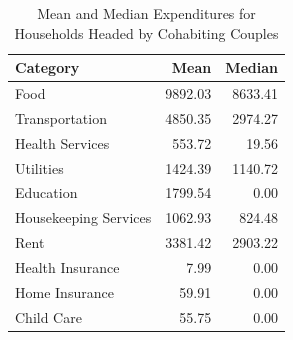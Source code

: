 \begin{table}[htbp]
\centering
\caption{Mean and Median Expenditures for Households Headed by Cohabiting Couples} 
\label{tab:cohabiting_expenditures}
\begin{tabular}{lrr}
  \hline
Category & Mean & Median \\ 
  \hline
Food & 9892.03 & 8633.41 \\ 
  Transportation & 4850.35 & 2974.27 \\ 
  Health Services & 553.72 & 19.56 \\ 
  Utilities & 1424.39 & 1140.72 \\ 
  Education & 1799.54 & 0.00 \\ 
  Housekeeping Services & 1062.93 & 824.48 \\ 
  Rent & 3381.42 & 2903.22 \\ 
  Health Insurance & 7.99 & 0.00 \\ 
  Home Insurance & 59.91 & 0.00 \\ 
  Child Care & 55.75 & 0.00 \\ 
   \hline
\end{tabular}
\end{table}
